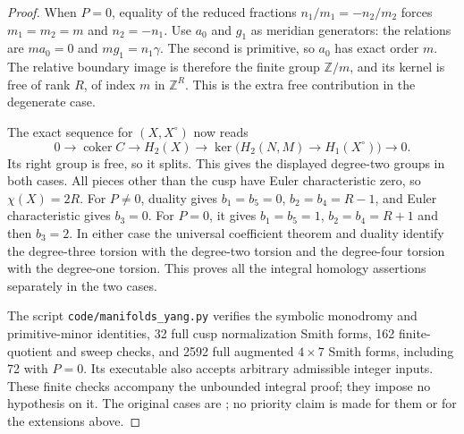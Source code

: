 \begin{proof}
When $P=0$, equality of the reduced fractions
$n_1/m_1=-n_2/m_2$ forces $m_1=m_2=m$ and $n_2=-n_1$.
Use $a_0$ and $g_1$ as meridian generators: the relations are
$ma_0=0$ and $mg_1=n_1\gamma$. The second is primitive,
so $a_0$ has exact order $m$. The relative boundary image is
therefore the finite group $\mathbb Z/m$, and its kernel is
free of rank $R$, of index $m$ in $\mathbb Z^R$.
This is the extra free contribution in the degenerate case.

The exact sequence for $(X,X^\circ)$ now reads
\[
 0\longrightarrow\operatorname{coker}C
 \longrightarrow H_2(X)
 \longrightarrow\ker\bigl(H_2(N,M)\to H_1(X^\circ)\bigr)
 \longrightarrow0.
\]
Its right group is free, so it splits. This gives the displayed
degree-two groups in both cases. All pieces other than the cusp
have Euler characteristic zero, so $\chi(X)=2R$.
For $P\ne0$, duality gives $b_1=b_5=0$, $b_2=b_4=R-1$,
and Euler characteristic gives $b_3=0$.
For $P=0$, it gives $b_1=b_5=1$, $b_2=b_4=R+1$ and then
$b_3=2$. In either case the universal coefficient theorem and
duality identify the degree-three torsion with the degree-two
torsion and the degree-four torsion with the degree-one torsion.
This proves all the integral homology assertions separately
in the two cases.

The script \texttt{code/manifolds\_yang.py} verifies the symbolic
monodromy and primitive-minor identities, 32 full cusp
normalization Smith forms, 162 finite-quotient and sweep
checks, and 2592 full augmented $4\times7$ Smith forms,
including 72 with $P=0$. Its executable also accepts arbitrary
admissible integer inputs. These finite checks accompany the
unbounded integral proof; they impose no hypothesis on it.
The original cases are \cite[Theorem 7.13]{manYang26}; no
priority claim is made for them or for the extensions above.
\end{proof}

